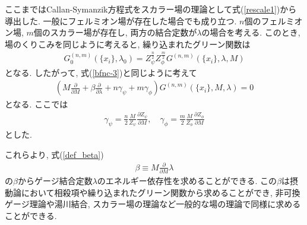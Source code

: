 ここまではCallan-Symanzik方程式をスカラー場の理論として式(\ref{rescale1})から導出した.
一般にフェルミオン場が存在した場合でも成り立つ.
$n$個のフェルミオン場, $m$個のスカラー場が存在し, 両方の結合定数が$\lambda$の場合を考える.
このとき, 場のくりこみを同じように考えると, 繰り込まれたグリーン関数は
\begin{align}
  G_0^{(n,m)}(\{x_i\},\lambda_0) = Z_\psi^{\frac{n}{2}} Z_\phi^{\frac{m}{2}}G^{(n,m)}(\{x_i\},\lambda,M)\label{renormalized_G}
\end{align}
となる.
したがって, 式(\ref{bfnc-3})と同じように考えて
\begin{align}
  \left(M\frac{\partial}{\partial M} + \beta\frac{\partial}{\partial \lambda} + n\gamma_\psi + m \gamma_\phi \right)G^{(n,m)}(\{x_i\},M,\lambda) = 0\label{renormalized_CS}
\end{align}
となる.
ここでは
\begin{align}
  \gamma_\psi = \frac{n}{2}\frac{M}{Z_\psi}\frac{\partial Z_\psi}{\partial M},\quad \gamma_\phi = \frac{m}{2}\frac{M}{Z_\phi}\frac{\partial Z_\phi}{\partial M}\label{def_gamma2}
\end{align}
とした.

これらより, 式(\ref{def_beta})
\begin{align}
  \beta \equiv M\frac{\partial}{\partial M}\lambda\nonumber
\end{align}
の$\beta$からゲージ結合定数$\lambda$のエネルギー依存性を求めることができる.
この$\beta$は摂動論において相殺項や繰り込まれたグリーン関数から求めることができ, 非可換ゲージ理論や湯川結合, スカラー場の理論など一般的な場の理論で同様に求めることができる.
\cite{chengHiggsPhenomenaAsymptotically1974,
machacekFermionHiggsMasses1981,
machacekTwoloopRenormalizationGroup1983,
machacekTwoloopRenormalizationGroup1984,
machacekTwoloopRenormalizationGroup1985,
maVariationMixingAngles1979,
vaughnRenormalizationGroupConstraints1982}
